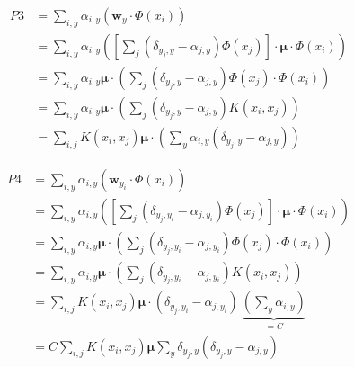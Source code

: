 \documentclass{article}
\begin{document}
\begin{align}
    P3 & = \sum_{i, y} \alpha_{i, y} \left(\mathbf{w}_{y} \cdot \Phi\left(x_{i}\right)\right) \\
       & = \sum_{i, y} \alpha_{i, y}
    \left(
    \left[
        \sum_{j}\left(\delta_{y_{j}, y}-\alpha_{j, y}\right) \Phi({x}_{j})
        \right]
    \cdot \bm{\mu} \cdot \Phi\left(x_{i}\right)
    \right)                                                                                   \\
       & = \sum_{i, y} \alpha_{i, y} \bm{\mu} \cdot
    \left(
    \sum_{j}\left(\delta_{y_{j}, y}-\alpha_{j, y}\right) \Phi({x}_{j})
    \cdot \Phi\left(x_{i}\right)
    \right)                                                                                   \\
       & = \sum_{i, y} \alpha_{i, y} \bm{\mu} \cdot
    \left(
    \sum_{j}\left(\delta_{y_{j}, y}-\alpha_{j, y}\right) K(x_i, x_j)
    \right)                                                                                   \\
       & = \sum_{i, j} K(x_i, x_j) \bm{\mu}
    \cdot
    \left(
    \sum_{y} \alpha_{i, y} \left(\delta_{y_{j}, y}-\alpha_{j, y}\right)
    \right)
\end{align}

\begin{align}
    P4 & = \sum_{i, y} \alpha_{i, y} \left(\mathbf{w}_{y_{i}} \cdot \Phi\left(x_{i}\right)\right) \\
       & = \sum_{i, y} \alpha_{i, y}
    \left(
    \left[
        \sum_{j}\left(\delta_{y_{j}, y_i}-\alpha_{j, y_i}\right) \Phi({x}_{j})
        \right]
    \cdot \bm{\mu} \cdot \Phi\left(x_{i}\right)
    \right)                                                                                       \\
       & = \sum_{i, y} \alpha_{i, y} \bm{\mu} \cdot
    \left(
    \sum_{j}\left(\delta_{y_{j}, y_i}-\alpha_{j, y_i}\right) \Phi({x}_{j})
    \cdot \Phi\left(x_{i}\right)
    \right)                                                                                       \\
       & = \sum_{i, y} \alpha_{i, y} \bm{\mu} \cdot
    \left(
    \sum_{j}\left(\delta_{y_{j}, y_i}-\alpha_{j, y_i}\right) K(x_i, x_j)
    \right)                                                                                       \\
       & = \sum_{i, j} K(x_i, x_j) \bm{\mu}
    \cdot
    \left(\delta_{y_{j}, y_i}-\alpha_{j, y_i}\right)\
    \underbrace{
        \left(
        \sum_{y} \alpha_{i, y}
        \right)
    }_{=C}                                                                                        \\
       & = C \sum_{i, j} K(x_i, x_j) \bm{\mu}
    \sum_{y} \delta_{y_{j}, y} (\delta_{y_{j}, y}-\alpha_{j, y})
\end{align}
\end{document}
